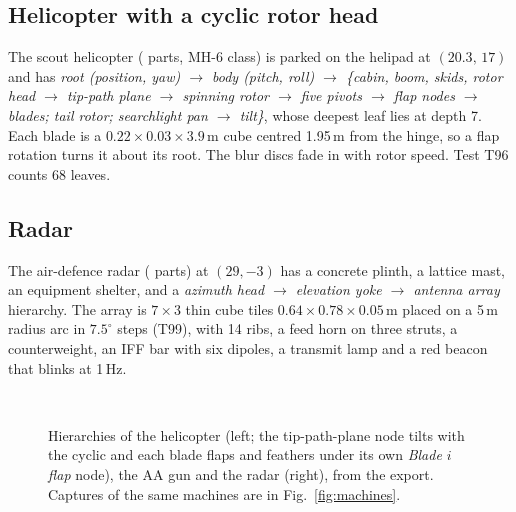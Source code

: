 \subsection{Helicopter with a cyclic rotor head}
The scout helicopter (\partsHeli{} parts, MH-6 class) is parked on the helipad at $(20.3,\,17)$ and has
\emph{root (position, yaw) $\to$ body (pitch, roll) $\to$ \{cabin, boom, skids, rotor head $\to$ tip-path plane $\to$
spinning rotor $\to$ five pivots $\to$ flap nodes $\to$ blades; tail rotor; searchlight pan $\to$ tilt\}}, whose deepest
leaf lies at depth 7. Each blade is a $0.22\times0.03\times3.9$\,m cube centred 1.95\,m from the hinge,
so a flap rotation turns it about its root. The blur discs fade in with rotor speed. Test T96 counts 68 leaves.


\subsection{Radar}
The air-defence radar (\partsRadar{} parts) at $(29,-3)$ has a concrete plinth, a lattice mast, an equipment shelter, and a
\emph{azimuth head $\to$ elevation yoke $\to$ antenna array} hierarchy. The array is $7\times3$ thin cube tiles
$0.64\times0.78\times0.05$\,m placed on a 5\,m radius arc in $7.5^\circ$ steps (T99), with 14 ribs, a feed horn on
three struts, a counterweight, an IFF bar with six dipoles, a transmit lamp and a red beacon that blinks at 1\,Hz.


\begin{figure}[h]
\centering
\begin{minipage}[t]{0.55\linewidth}\vspace{0pt}\end{minipage}\hfill
\begin{minipage}[t]{0.42\linewidth}\vspace{0pt}\\[3mm]\end{minipage}
\caption{Hierarchies of the helicopter (left; the tip-path-plane node tilts with the cyclic and each blade flaps and feathers under its own \emph{Blade $i$ flap} node), the AA gun and
the radar (right), from the export. Captures of the same machines are in Fig.~\ref{fig:machines}.}
\label{fig:tree-air}
\end{figure}

